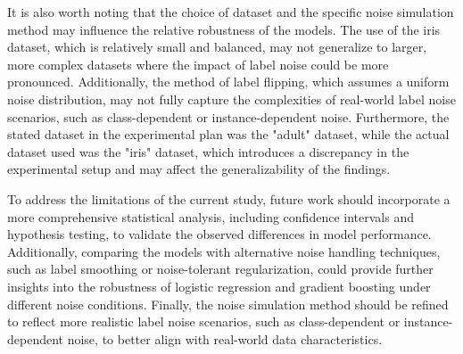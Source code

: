 \documentclass{article}
\begin{document}
It is also worth noting that the choice of dataset and the specific noise simulation method may influence the relative robustness of the models. The use of the iris dataset, which is relatively small and balanced, may not generalize to larger, more complex datasets where the impact of label noise could be more pronounced. Additionally, the method of label flipping, which assumes a uniform noise distribution, may not fully capture the complexities of real-world label noise scenarios, such as class-dependent or instance-dependent noise. Furthermore, the stated dataset in the experimental plan was the "adult" dataset, while the actual dataset used was the "iris" dataset, which introduces a discrepancy in the experimental setup and may affect the generalizability of the findings.

To address the limitations of the current study, future work should incorporate a more comprehensive statistical analysis, including confidence intervals and hypothesis testing, to validate the observed differences in model performance. Additionally, comparing the models with alternative noise handling techniques, such as label smoothing or noise-tolerant regularization, could provide further insights into the robustness of logistic regression and gradient boosting under different noise conditions. Finally, the noise simulation method should be refined to reflect more realistic label noise scenarios, such as class-dependent or instance-dependent noise, to better align with real-world data characteristics.
\end{document}
